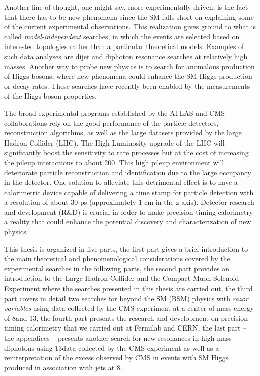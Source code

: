 Another line of thought, one might say, more experimentally driven, is
the fact that there has to be new phenomena since the SM falls short
on explaining some of the current experimental observations. This realization gives
ground to what is called \textit{model-independent} searches, in which
the events are selected based on interested topologies rather than a
particular theoretical models. Examples of such data analyses are dijet and
diphoton resonance searches at relatively high masses. Another way to
probe new physics is to search for anomalous production of Higgs
bosons, where new phenomena could enhance the SM Higgs production or
decay rates. These searches have recently been enabled by the
measurements of the Higgs boson properties.

The broad experimental programs established by the ATLAS and CMS
collaborations rely on the good performance of the particle detectors,
reconstruction algorithms, as well as the large datasets provided by
the large Hadron Collider (LHC). The High-Luminosity upgrade of the
LHC will significantly boost the sensitivity to rare processes but at
the cost of increasing the pileup interactions to about 200. This high
pileup environment will deteriorate particle reconstruction and
identification due to the large occupancy in the detector. One
solution to alleviate this detrimental effect is to have a
calorimetric device capable of delivering a time stamp for particle
detection with a resolution of about 30 ps (approximately 1 cm in the
z-axis). Detector research and  development (R\&D) is crucial in order
to make precision timing calorimetry a reality that could enhance the
potential discovery and characterization of new physics. 


This thesis is organized in five parts, the first part gives a brief
introduction to the main theoretical and phenomenological
considerations covered  by the experimental searches in the following
parts, the second part provides an introduction to the Large Hadron
Collider and the Compact Muon Solenoid Experiment where the searches
presented in this thesis are carried out, the third part covers in
detail two searches for beyond the SM (BSM) physics with \textit{razor variables} using data collected by
the CMS experiment at a center-of-mass energy of 8\TeV and 13\TeV, the
fourth part presents the research and development on precision timing
calorimetry that we carried out at Fermilab and CERN, the last part -- the appendices
-- presents another search for new resonances in high-mass diphotons using 13\TeV data collected by the CMS experiment as well
as a reinterpretation of the excess observed by CMS in events with SM
Higgs produced in association with jets at 8\TeV.


